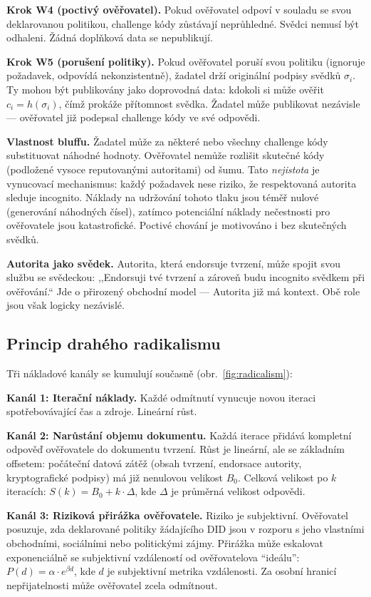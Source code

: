 \documentclass[11pt,a4paper,twocolumn]{article}
\begin{document}
\textbf{Krok W4 (poctivý ověřovatel).} Pokud ověřovatel odpoví v souladu se svou deklarovanou politikou, challenge kódy zůstávají neprůhledné. Svědci nemusí být odhaleni. Žádná doplňková data se nepublikují.

\textbf{Krok W5 (porušení politiky).} Pokud ověřovatel poruší svou politiku (ignoruje požadavek, odpovídá nekonzistentně), žadatel drží originální podpisy svědků $\sigma_i$. Ty mohou být publikovány jako doprovodná data: kdokoli si může ověřit $c_i = h(\sigma_i)$, čímž prokáže přítomnost svědka. Žadatel může publikovat nezávisle --- ověřovatel již podepsal challenge kódy ve své odpovědi.

\textbf{Vlastnost bluffu.} Žadatel může za některé nebo všechny challenge kódy substituovat náhodné hodnoty. Ověřovatel nemůže rozlišit skutečné kódy (podložené vysoce reputovanými autoritami) od šumu. Tato \emph{nejistota} je vynucovací mechanismus: každý požadavek nese riziko, že respektovaná autorita sleduje incognito. Náklady na udržování tohoto tlaku jsou téměř nulové (generování náhodných čísel), zatímco potenciální náklady nečestnosti pro ověřovatele jsou katastrofické. Poctivé chování je motivováno i bez skutečných svědků.

\textbf{Autorita jako svědek.} Autorita, která endorsuje tvrzení, může spojit svou službu se svědeckou: ,,Endorsuji tvé tvrzení a zároveň budu incognito svědkem při ověřování.`` Jde o přirozený obchodní model --- Autorita již má kontext. Obě role jsou však logicky nezávislé.

\subsection{Princip drahého radikalismu}

Tři nákladové kanály se kumulují současně (obr.~\ref{fig:radicalism}):

\textbf{Kanál 1: Iterační náklady.} Každé odmítnutí vynucuje novou iteraci spotřebovávající čas a zdroje. Lineární růst.

\textbf{Kanál 2: Narůstání objemu dokumentu.} Každá iterace přidává kompletní odpověď ověřovatele do dokumentu tvrzení. Růst je lineární, ale se základním offsetem: počáteční datová zátěž (obsah tvrzení, endorsace autority, kryptografické podpisy) má již nenulovou velikost $B_0$. Celková velikost po $k$ iteracích: $S(k) = B_0 + k \cdot \Delta$, kde $\Delta$ je průměrná velikost odpovědi.

\textbf{Kanál 3: Riziková přirážka ověřovatele.} Riziko je subjektivní. Ověřovatel posuzuje, zda deklarované politiky žádajícího DID jsou v rozporu s jeho vlastními obchodními, sociálními nebo politickými zájmy. Přirážka může eskalovat exponenciálně se subjektivní vzdáleností od ověřovatelova ``ideálu'': $P(d) = \alpha \cdot e^{\beta d}$, kde $d$ je subjektivní metrika vzdálenosti. Za osobní hranicí nepřijatelnosti může ověřovatel zcela odmítnout.
\end{document}
